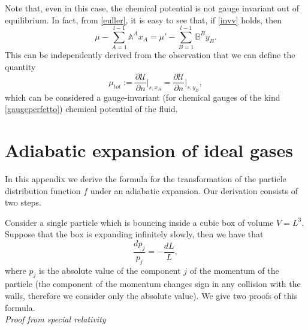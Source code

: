 \documentclass[useAMS,usenatbib,prd,twocolumn,nofootinbib]{revtex4-1}
\begin{document}
Note that, even in this case, the chemical potential is not gauge invariant out of equilibrium. In fact, from \eqref{euller}, it is easy to see that, if \eqref{invv} holds, then 
\begin{equation}
 \mu - \sum_{A=1}^{l-1} \mathbb{A}^A x_A = \mu' - \sum_{B=1}^{l-1} \mathbb{B}^B y_B.
\end{equation}
This can be independently derived from the observation that we can define the quantity
\begin{equation}
\mu_{tot} := \dfrac{\partial \mathcal{U}}{\partial n} \bigg|_{s,x_A} = \dfrac{\partial \mathcal{U}}{\partial n} \bigg|_{s,y_B} ,
\end{equation}
which can be considered a gauge-invariant (for chemical gauges of the kind \eqref{gaugeperfetto}) chemical potential of the fluid. 



\section{Adiabatic expansion of ideal gases}\label{sec:adexp}

In this appendix we derive the formula for the transformation of the particle distribution function $f$ under an adiabatic expansion. Our derivation consists of two steps. 

Consider a single particle which is bouncing inside a cubic box of volume $V=L^3$. Suppose that the box is expanding infinitely slowly, then we have that
\begin{equation}\label{ADD}
\dfrac{dp_j}{p_j} = - \dfrac{dL}{L} ,
\end{equation}
where $p_j$ is the absolute value of the component $j$ of the momentum of the particle (the component of the momentum changes sign in any collision with the walls, therefore we consider only the absolute value). We give two proofs of this formula.\\

\textit{Proof from special relativity}
\end{document}
